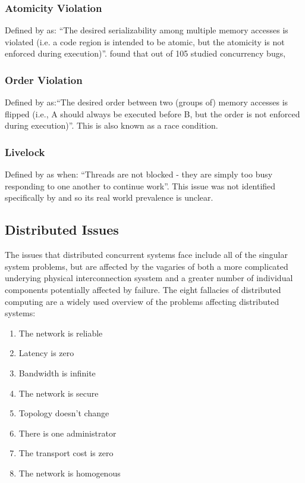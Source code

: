 \documentclass{sig-alternate}
\begin{document}
\subsubsection{Atomicity Violation}
Defined by \cite{shanlu08:_learn_mistak_compr_study_real} as: ``The desired serializability among multiple memory accesses is violated (i.e. a code region is intended to be atomic, but the atomicity is not enforced during execution)''. \cite{shanlu08:_learn_mistak_compr_study_real} found that out of 105 studied concurrency bugs, 

\subsubsection{Order Violation}
Defined by \cite{shanlu08:_learn_mistak_compr_study_real} as:``The desired order between two (groups of) memory accesses is flipped (i.e., A should always be executed before B, but the order is not enforced during execution)''. This is also known as a race condition. 

\subsubsection{Livelock}
Defined by \cite{oracle:_starv_livel} as when: ``Threads are not blocked - they are simply too busy responding to one another to continue work''. This issue was not identified specifically by \cite{shanlu08:_learn_mistak_compr_study_real} and so its real world prevalence is unclear.

\subsection{Distributed Issues}
The issues that distributed concurrent systems face include all of the singular system problems, but are affected by the vagaries of both a more complicated underying physical interconnection sysstem and a greater number of individual components potentially affected by failure. The eight fallacies of distributed computing are a widely used overview of the problems affecting distributed systems:

\begin{enumerate}
\item The network is reliable
\item Latency is zero
\item Bandwidth is infinite
\item The network is secure
\item Topology doesn't change
\item There is one administrator
\item The transport cost is zero
\item The network is homogenous
\end{enumerate}
\end{document}
